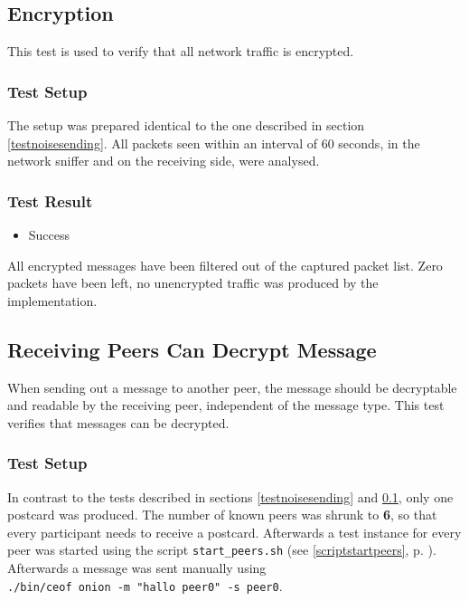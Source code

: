 \subsection{Encryption}
\label{testencryption}
This test is used to verify that all network traffic is encrypted.
\subsubsection{Test Setup}
The setup was prepared identical to the one described
in section \ref{testnoisesending}. All packets seen within
an interval of 60 seconds, in the network sniffer and on 
the receiving side, were analysed.
\subsubsection{Test Result}
\begin{itemize}
\item Success
\end{itemize}
All encrypted messages have been filtered out of the captured
packet list. Zero packets have been left, no unencrypted traffic
was produced by the implementation.
\subsection{Receiving Peers Can Decrypt Message}
When sending out a message to another peer, the message should
be decryptable and readable by the receiving peer, independent of the
message type. This test verifies that messages can be decrypted.
\subsubsection{Test Setup}
In contrast to the tests described in sections
\ref{testnoisesending} and \ref{testencryption}, only
one postcard was produced. The number of known peers was shrunk
to \textbf{6}, so that every participant needs to receive a postcard.
Afterwards a test instance for every peer was started using
the script \verb=start_peers.sh= (see \ref{scriptstartpeers}, p.
\pageref{scriptstartpeers}).
Afterwards a message was sent manually using
\\ \verb=./bin/ceof onion -m "hallo peer0" -s peer0=.

